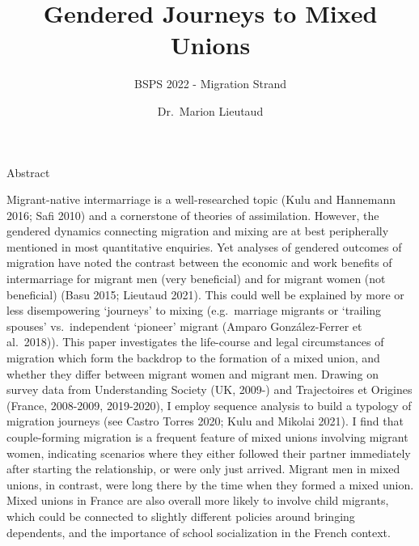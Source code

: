 \documentclass[
  ignorenonframetext,
]{beamer}
\title{Gendered Journeys to Mixed Unions}
\subtitle{BSPS 2022 - Migration Strand}
\author{Dr.~Marion Lieutaud}
\date{}
\institute{London School of Economics, Department of Methodology,
Understanding Society research fellow}
\begin{document}
\frame{\titlepage}
\ifdefined\Shaded\renewenvironment{Shaded}{\begin{tcolorbox}[interior hidden, frame hidden, enhanced, borderline west={3pt}{0pt}{shadecolor}, breakable, boxrule=0pt, sharp corners]}{\end{tcolorbox}}\fi

\begin{frame}{Abstract}
\protect\hypertarget{abstract}{}

Migrant-native intermarriage is a well-researched topic (Kulu and
Hannemann 2016; Safi 2010) and a cornerstone of theories of
assimilation. However, the gendered dynamics connecting migration and
mixing are at best peripherally mentioned in most quantitative
enquiries. Yet analyses of gendered outcomes of migration have noted the
contrast between the economic and work benefits of intermarriage for
migrant men (very beneficial) and for migrant women (not beneficial)
(Basu 2015; Lieutaud 2021). This could well be explained by more or less
disempowering `journeys' to mixing (e.g.~marriage migrants or `trailing
spouses' vs.~independent `pioneer' migrant (Amparo González-Ferrer et
al.~2018)). This paper investigates the life-course and legal
circumstances of migration which form the backdrop to the formation of a
mixed union, and whether they differ between migrant women and migrant
men. Drawing on survey data from Understanding Society (UK, 2009-) and
Trajectoires et Origines (France, 2008-2009, 2019-2020), I employ
sequence analysis to build a typology of migration journeys (see Castro
Torres 2020; Kulu and Mikolai 2021). I find that couple-forming
migration is a frequent feature of mixed unions involving migrant women,
indicating scenarios where they either followed their partner
immediately after starting the relationship, or were only just arrived.
Migrant men in mixed unions, in contrast, were long there by the time
when they formed a mixed union. Mixed unions in France are also overall
more likely to involve child migrants, which could be connected to
slightly different policies around bringing dependents, and the
importance of school socialization in the French context.


\end{frame}
\end{document}
